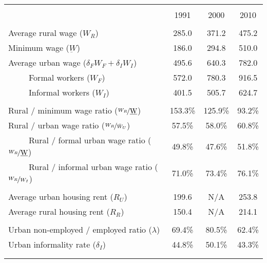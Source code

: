 \begin{tabular}{lrrr}
\toprule &       &       &  \\
      & \multicolumn{1}{c}{1991} & \multicolumn{1}{c}{2000} & \multicolumn{1}{c}{2010} \bigstrut[b]\\
\cline{2-4}      &       &       &  \bigstrut[t]\\
Average rural wage ($W_{R}$) & \multicolumn{1}{c}{285.0} & \multicolumn{1}{c}{371.2} & \multicolumn{1}{c}{475.2} \\
Minimum wage  ($\underbar{W}$) & \multicolumn{1}{c}{186.0} & \multicolumn{1}{c}{294.8} & \multicolumn{1}{c}{510.0} \\
Average urban wage ($\delta_{F} W_{F}+\delta_{I} W_{I}$) & \multicolumn{1}{c}{495.6} & \multicolumn{1}{c}{640.3} & \multicolumn{1}{c}{782.0} \\
~~~~~Formal workers ($W_{F}$) & \multicolumn{1}{c}{572.0} & \multicolumn{1}{c}{780.3} & \multicolumn{1}{c}{916.5} \\
~~~~~Informal workers ($W_{I}$) & \multicolumn{1}{c}{401.5} & \multicolumn{1}{c}{505.7} & \multicolumn{1}{c}{624.7} \\
      &       &       &  \\
Rural / minimum wage ratio ($\nicefrac{W_{R}}{\underbar{W}}$) & \multicolumn{1}{c}{153.3\%} & \multicolumn{1}{c}{125.9\%} & \multicolumn{1}{c}{93.2\%} \\
Rural / urban wage ratio ($\nicefrac{W_{R}}{\bar{W}_{U}}$) & \multicolumn{1}{c}{57.5\%} & \multicolumn{1}{c}{58.0\%} & \multicolumn{1}{c}{60.8\%} \\
~~~~~Rural / formal urban wage ratio ($\nicefrac{W_{R}}{\underbar{W}}$) & \multicolumn{1}{c}{49.8\%} & \multicolumn{1}{c}{47.6\%} & \multicolumn{1}{c}{51.8\%} \\
~~~~~Rural / informal urban wage ratio ($\nicefrac{W_{R}}{W_{I}}$) & \multicolumn{1}{c}{71.0\%} & \multicolumn{1}{c}{73.4\%} & \multicolumn{1}{c}{76.1\%} \\
      &       &       &  \\
Average urban housing rent ($R_{U}$) & \multicolumn{1}{c}{199.6} & \multicolumn{1}{c}{N/A} & \multicolumn{1}{c}{253.8} \\
Average rural housing rent ($R_{R}$) & \multicolumn{1}{c}{150.4} & \multicolumn{1}{c}{N/A} & \multicolumn{1}{c}{214.1} \\
      &       &       &  \\
Urban non-employed / employed ratio ($\lambda$) & \multicolumn{1}{c}{69.4\%} & \multicolumn{1}{c}{80.5\%} & \multicolumn{1}{c}{62.4\%} \\
Urban informality rate ($\delta_{I}$) & \multicolumn{1}{c}{44.8\%} & \multicolumn{1}{c}{50.1\%} & \multicolumn{1}{c}{43.3\%} \\
      &       &       &  \\
\bottomrule &       &       &  \\
\end{tabular}%
